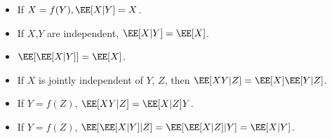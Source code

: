 \begin{theorem}
\proplabel

\begin{itemize}
	\item If $X = f(Y), \EE[X|Y] = X$.
	\item If $X$,$Y$ are independent, $\EE[X|Y] = \EE[X]$. 
	\item $\EE[\EE[X|Y]] = \EE[X]$. 
	\item If $X$ is jointly independent of $Y$, $Z$, then $\EE[XY|Z] = \EE[X]\EE[Y|Z]$. 
	\item If $Y=f(Z)$, $\EE[XY|Z] = \EE[X|Z]Y$.
	\item If $Y=f(Z)$, $\EE[\EE[X|Y]|Z] = \EE[\EE[X|Z]|Y] = \EE[X|Y]$. 
\end{itemize}
\end{theorem}
